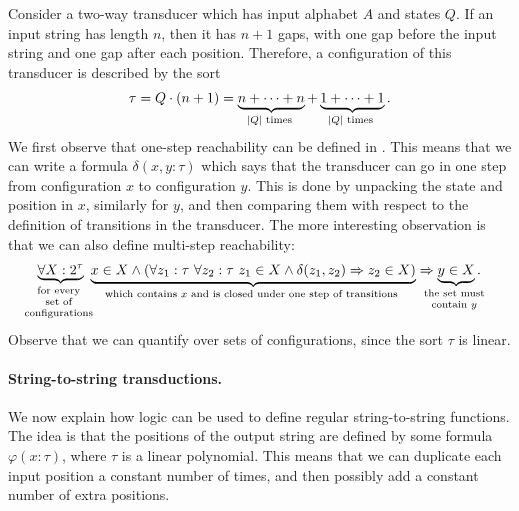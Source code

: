 \begin{myexample}\label{ex:reachability-of-configurations}
    Consider a two-way transducer which has input alphabet $A$ and states $Q$. If an input string has length $n$, then it has $n+1$ gaps, with one gap before the input string and one gap after each position. Therefore,  a configuration of this transducer is described by the sort
    \begin{align*}
    \tau = Q \cdot (n +1) = 
    \myunderbrace{n + \cdots + n}{$|Q|$ times} + 
    \myunderbrace{1 + \cdots + 1}{$|Q|$ times}.
    \end{align*}
    We first observe that one-step reachability can be defined in \mso. This means that we can write a formula $\delta(x,y : \tau)$
    which says that the transducer can go in one step from configuration $x$ to configuration $y$. This is done by unpacking the state and position in $x$, similarly for $y$, and then comparing them with respect to the definition of transitions in the transducer. The more interesting observation is that we can also define multi-step reachability:    
    \begin{align*}
    \myunderbrace{\forall X: 2^\tau}{for every \\ set of \\ configurations} \ \myunderbrace{x \in X \land (\forall z_1 : \tau\ \forall z_2 : \tau\ z_1 \in X \land \delta(z_1,z_2) \Rightarrow z_2 \in X )}{which contains $x$ and is closed under one step of transitions} \Rightarrow \myunderbrace{y \in X}{the set must \\ contain $y$}.
    \end{align*}
    Observe that we can quantify over sets of configurations, since the sort $\tau$ is linear.
\end{myexample}


\paragraph*{String-to-string \mso transductions.}
We now explain how \mso logic can be used to define regular string-to-string functions. The idea is that the positions of the output string are defined by some formula $\varphi(x : \tau)$, where $\tau$ is a linear polynomial. This means that we can duplicate each input position a constant number of times, and then possibly add a constant number of extra positions. 



